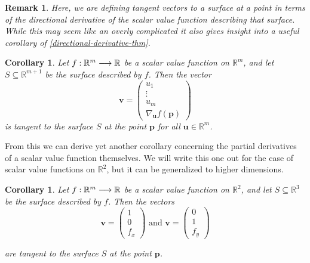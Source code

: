 \documentclass[12pt]{book}
\newcommand{\rbb}{\mathbb{R}}
\theoremstyle{definitionstyle}
\newtheorem{remark}[definition]{Remark}
\newtheorem{corollary}[definition]{Corollary}
\numberwithin{equation}{section}
\begin{document}
\vspace{0.5cm}

\begin{remark}
    Here, we are defining tangent vectors to a surface at a point in terms of the directional derivative of the scalar value function describing that surface. While this may seem like an overly complicated it also gives insight into a useful corollary of \ref{directional-derivative-thm}. 
\end{remark}
\vspace{0.5cm}
\begin{corollary}\label{directional-derivatives-are-tangent}
    Let $\func{f}{\rbb^m}{\rbb}$ be a scalar value function on $\rbb^m$, and let $S \subseteq \rbb^{m+1}$ be the surface described by $f$. Then the vector
    \begin{equation}
	\mathbf{v} = \begin{pmatrix} u_1 \\ \vdots \\ u_m \\ \nabla_\mathbf{u} f(\mathbf{p}) \end{pmatrix}
    \end{equation}
    is tangent to the surface $S$ at the point $\mathbf{p}$ for all $\mathbf{u} \in \rbb^m$.
\end{corollary}

\vspace{0.5cm}

From this we can derive yet another corollary concerning the partial derivatives of a scalar value function themselves. We will write this one out for the case of scalar value functions on $\rbb^2$, but it can be generalized to higher dimensions.

\begin{corollary}\label{partial-derivatives-are-tangent}
	Let $\func{f}{\rbb^m}{\rbb}$ be a scalar value function on $\rbb^2$, and let $S \subseteq \rbb^{3}$ be the surface described by $f$. Then the vectors
	\begin{equation}
	    \mathbf{v} = \begin{pmatrix} 1 \\ 0 \\ f_x \end{pmatrix} \text{ and } \mathbf{v} = \begin{pmatrix} 0 \\ 1 \\ f_y \end{pmatrix}
	\end{equation}
	
	\vspace{0.5cm}

	are tangent to the surface $S$ at the point $\mathbf{p}$.
\end{corollary}
\end{document}

